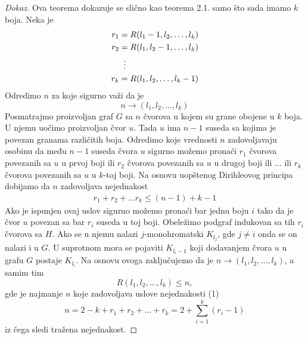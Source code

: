 \documentclass{article}
\theoremstyle{definition}
\newcommand{\dokaz}[1]{\begin{proof}[Dokaz]#1\end{proof}}
\begin{document}
	\dokaz{
		Ova teorema dokazuje se slično kao teorema 2.1. samo što sada imamo $k$ boja. Neka je
		\begin{align*}
		r_1 &= R(l_1 - 1, l_2, \dots, l_k) \\
		r_2 &= R(l_1, l_2 - 1, \dots, l_k) \\
		&\;\;\vdots \notag \\
		r_k &= R(l_1, l_2, \dots, l_k - 1) \\
		\end{align*}
		Odredimo $n$ za koje sigurno važi da je 
		$$n \rightarrow (l_1, l_2, \dots, l_k)$$
		Posmatrajmo proizvoljan graf $G$ sa $n$ čvorova u kojem su grane obojene u $k$ boja.
		U njemu uočimo proizvoljan čvor $u$. Tada $u$ ima $n - 1$ 
		suseda sa kojima je povezan granama različitih boja. Odredimo koje vrednosti $n$ zadovoljavaju osobinu da među $n - 1$ suseda čvora $u$ sigurno
		možemo pronaći $r_1$ čvorova povezanih sa $u$ u prvoj boji ili $r_2$ čvorova povezanih sa $u$ u drugoj boji ili $\dots$ ili $r_k$ čvorova povezanih sa 		$u$ u $k$-toj boji. Na osnovu uopštenog Dirihleovog principa dobijamo da $n$ zadovoljava nejednakost
		\begin{align} r_1 + r_2 + \dots r_k \leq (n - 1) + k - 1 \end{align}
		Ako je ispunjen ovaj uslov sigurno možemo pronaći bar jednu boju $i$ tako da je čvor $u$ povezan sa bar $r_i$ suseda u toj boji. Obeležimo podgraf
		indukovan sa tih $r_i$ čvorova sa $H$. Ako se u njemu nalazi $j$-monohromatski $K_{l_j}$, gde $j \neq i$ onda se on nalazi i u $G$. U suprotnom mora          
		se pojaviti $K_{l_i - 1}$ koji dodavanjem čvora $u$ u grafu $G$ postaje $K_{l_i}$. Na osnovu ovoga zaključujemo da je 
		$n \rightarrow (l_1, l_2, \dots, l_k)$, a samim tim \newline
		$$R(l_1, l_2, \dots, l_k) \leq n,$$ gde je najmanje $n$ koje zadovoljava uslove nejednakosti (1)
		$$n = 2 - k + r_1 + r_2 + \dots + r_k = 2 + \sum_{i = 1}^{k} (r_i - 1)$$
		iz čega sledi tražena nejednakost.
		
	}
	
\end{document}
